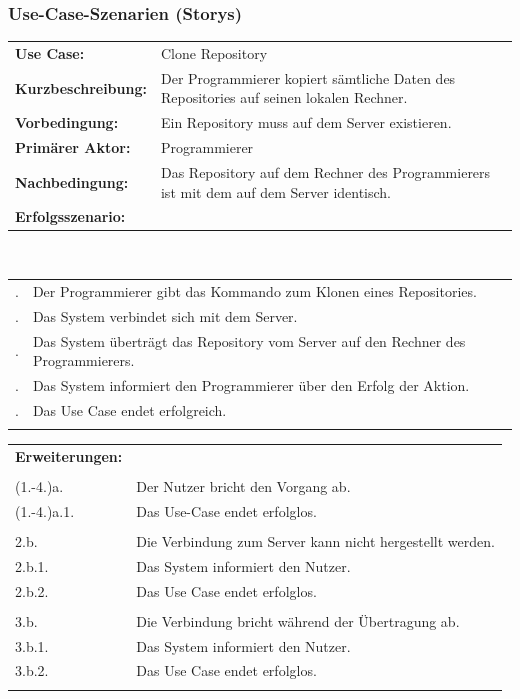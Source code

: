\documentclass[a4paper]{article}
\begin{document}
\newpage	
\subsubsection{Use-Case-Szenarien (Storys)}

	
\begin{tabularx}{\textwidth}{lX}
\\
\textbf{Use Case:} & Clone Repository \\
\textbf{Kurzbeschreibung:}& Der Programmierer kopiert sämtliche Daten des Repositories auf seinen lokalen Rechner. \\ 
\textbf{Vorbedingung:} & Ein Repository muss auf dem Server existieren.  \\ 
\textbf{Primärer Aktor:} & Programmierer  \\ 
\textbf{Nachbedingung:} & Das Repository auf dem Rechner des Programmierers ist mit dem auf dem Server identisch.  \\ 
\textbf{Erfolgsszenario:} & 
\end{tabularx}
\\
\begin{tabularx}{\textwidth}{lX}
\\
\qquad 1. & Der Programmierer gibt das Kommando zum Klonen eines Repositories. \\
\qquad 2. & Das System verbindet sich mit dem Server. \\
\qquad 3. & Das System überträgt das Repository vom Server auf den Rechner des Programmierers. \\
\qquad 4. & Das System informiert den Programmierer über den Erfolg der Aktion. \\
\qquad 5. & Das Use Case endet erfolgreich.\\\\\hline
\end{tabularx}

\begin{tabularx}{\textwidth}{lX}
\textbf{Erweiterungen:}\\\\
\qquad \qquad (1.-4.)a. & Der Nutzer bricht den Vorgang ab.\\
\qquad \qquad (1.-4.)a.1. & Das Use-Case endet erfolglos.\\
\\
\qquad \qquad 2.b. & Die Verbindung zum Server kann nicht hergestellt werden.\\
\qquad \qquad 2.b.1. & Das System informiert den Nutzer. \\
\qquad \qquad 2.b.2. & Das Use Case endet erfolglos. \\
\\
\qquad \qquad 3.b. & Die Verbindung bricht während der Übertragung ab.\\
\qquad \qquad 3.b.1. & Das System informiert den Nutzer. \\
\qquad \qquad 3.b.2. & Das Use Case endet erfolglos. \\\\

\end{tabularx}
\end{document}
